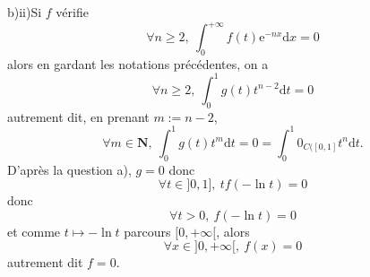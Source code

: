 \documentclass[a4paper,12pt,reqno]{amsart}
\begin{document}
b)ii)Si $f$ vérifie
$$\forall n\geqslant 2,\ \int_0^{+\infty}f(t)\mathrm e^{-nx}\mathrm dx=0$$
alors en gardant les notations précédentes, on a 
$$\forall n\geqslant 2,\ \int_0^1g(t)t^{n-2}\mathrm dt=0$$
autrement dit, en prenant $m:=n-2$,
$$\forall m\in\mathbf N,\ \int_0^1g(t)t^{m}\mathrm dt=0=\int_0^1 0_{C([0,1]}t^n\mathrm dt.$$
D'après la question a), $g=0$ donc
$$\forall t\in]0,1],\ tf(-\ln t)=0$$
donc
$$\forall t>0,\ f(-\ln t)=0$$
et comme $t\mapsto -\ln t$ parcours $[0,+\infty[$, alors 
$$\forall x\in]0,+\infty[,\ f(x)=0$$
autrement dit $f=0$.
\end{document}
